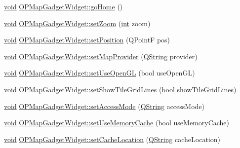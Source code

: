 \begin{DoxyCompactItemize}
\item 
\hyperlink{group___u_a_v_objects_plugin_ga444cf2ff3f0ecbe028adce838d373f5c}{void} \hyperlink{group___o_p_map_plugin_gab81157189920148cb4178548aeef4b92}{O\-P\-Map\-Gadget\-Widget\-::go\-Home} ()
\item 
\hyperlink{group___u_a_v_objects_plugin_ga444cf2ff3f0ecbe028adce838d373f5c}{void} \hyperlink{group___o_p_map_plugin_gaa2731b7fb965c417860b30ac354437ca}{O\-P\-Map\-Gadget\-Widget\-::set\-Zoom} (\hyperlink{ioapi_8h_a787fa3cf048117ba7123753c1e74fcd6}{int} zoom)
\item 
\hyperlink{group___u_a_v_objects_plugin_ga444cf2ff3f0ecbe028adce838d373f5c}{void} \hyperlink{group___o_p_map_plugin_ga4c9793fea42fd12ba9f7f27c25f98523}{O\-P\-Map\-Gadget\-Widget\-::set\-Position} (Q\-Point\-F pos)
\item 
\hyperlink{group___u_a_v_objects_plugin_ga444cf2ff3f0ecbe028adce838d373f5c}{void} \hyperlink{group___o_p_map_plugin_gab677b7feb42a6edd833e63325d2a928b}{O\-P\-Map\-Gadget\-Widget\-::set\-Map\-Provider} (\hyperlink{group___u_a_v_objects_plugin_gab9d252f49c333c94a72f97ce3105a32d}{Q\-String} provider)
\item 
\hyperlink{group___u_a_v_objects_plugin_ga444cf2ff3f0ecbe028adce838d373f5c}{void} \hyperlink{group___o_p_map_plugin_ga98807be867cfbdd8a0eeb05835b63a75}{O\-P\-Map\-Gadget\-Widget\-::set\-Use\-Open\-G\-L} (bool use\-Open\-G\-L)
\item 
\hyperlink{group___u_a_v_objects_plugin_ga444cf2ff3f0ecbe028adce838d373f5c}{void} \hyperlink{group___o_p_map_plugin_ga30af002abadbc8e420a9fe75f5042765}{O\-P\-Map\-Gadget\-Widget\-::set\-Show\-Tile\-Grid\-Lines} (bool show\-Tile\-Grid\-Lines)
\item 
\hyperlink{group___u_a_v_objects_plugin_ga444cf2ff3f0ecbe028adce838d373f5c}{void} \hyperlink{group___o_p_map_plugin_ga5187482d55aa0753cb6395bef5c402dd}{O\-P\-Map\-Gadget\-Widget\-::set\-Access\-Mode} (\hyperlink{group___u_a_v_objects_plugin_gab9d252f49c333c94a72f97ce3105a32d}{Q\-String} access\-Mode)
\item 
\hyperlink{group___u_a_v_objects_plugin_ga444cf2ff3f0ecbe028adce838d373f5c}{void} \hyperlink{group___o_p_map_plugin_gad5bce7bba1964ba7d8303ec72e107dd8}{O\-P\-Map\-Gadget\-Widget\-::set\-Use\-Memory\-Cache} (bool use\-Memory\-Cache)
\item 
\hyperlink{group___u_a_v_objects_plugin_ga444cf2ff3f0ecbe028adce838d373f5c}{void} \hyperlink{group___o_p_map_plugin_gab99ed3caf53adec86782ef89c0e8f47a}{O\-P\-Map\-Gadget\-Widget\-::set\-Cache\-Location} (\hyperlink{group___u_a_v_objects_plugin_gab9d252f49c333c94a72f97ce3105a32d}{Q\-String} cache\-Location)

\end{DoxyCompactItemize}
